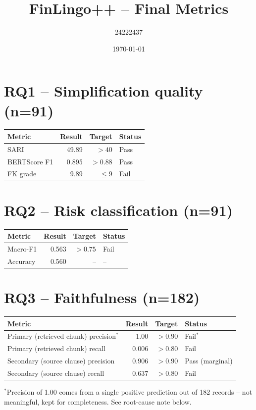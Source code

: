 \documentclass[11pt]{article}
\title{FinLingo++ -- Final Metrics}
\author{24222437}
\date{\today}
\begin{document}
\maketitle

\section*{RQ1 -- Simplification quality (n=91)}
\begin{table}[h!]
\centering
\begin{tabular}{lrrl}
\toprule
Metric & Result & Target & Status \\
\midrule
SARI & 49.89 & $>40$ & Pass \\
BERTScore F1 & 0.895 & $>0.88$ & Pass \\
FK grade & 9.89 & $\leq 9$ & Fail \\
\bottomrule
\end{tabular}
\end{table}

\section*{RQ2 -- Risk classification (n=91)}
\begin{table}[h!]
\centering
\begin{tabular}{lrrl}
\toprule
Metric & Result & Target & Status \\
\midrule
Macro-F1 & 0.563 & $>0.75$ & Fail \\
Accuracy & 0.560 & -- & -- \\
\bottomrule
\end{tabular}
\end{table}

\section*{RQ3 -- Faithfulness (n=182)}
\begin{table}[h!]
\centering
\begin{tabular}{lrrl}
\toprule
Metric & Result & Target & Status \\
\midrule
Primary (retrieved chunk) precision$^*$ & 1.00 & $>0.90$ & Fail$^*$ \\
Primary (retrieved chunk) recall & 0.006 & $>0.80$ & Fail \\
Secondary (source clause) precision & 0.906 & $>0.90$ & Pass (marginal) \\
Secondary (source clause) recall & 0.637 & $>0.80$ & Fail \\
\bottomrule
\end{tabular}
\end{table}
\noindent $^*$Precision of 1.00 comes from a single positive prediction out of 182 records --
not meaningful, kept for completeness. See root-cause note below.
\end{document}
